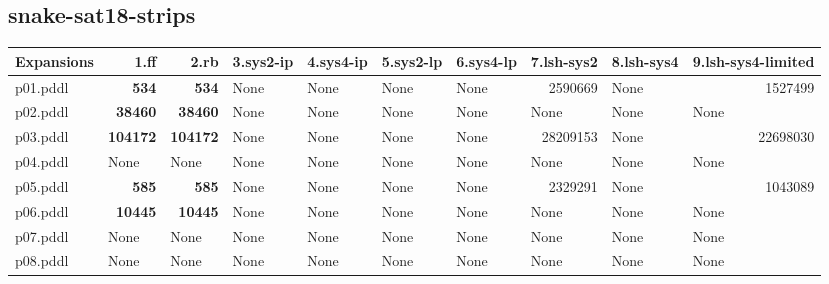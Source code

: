 \documentclass{article}
\begin{document}
\hypertarget{expansions-snake-sat18-strips}{}
\subsection*{snake-sat18-strips}

\begin{tabular}{@{}lrrrrrrrrr@{}}
Expansions & 1.ff & 2.rb & 3.sys2-ip & 4.sys4-ip & 5.sys2-lp & 6.sys4-lp & 7.lsh-sys2 & 8.lsh-sys4 & 9.lsh-sys4-limited \\
\midrule
p01.pddl & \textbf{534} & \textbf{534} & \multicolumn{1}{|l|}{None} & \multicolumn{1}{|l|}{None} & \multicolumn{1}{|l|}{None} & \multicolumn{1}{|l|}{None} & 2590669 & \multicolumn{1}{|l|}{None} & 1527499 \\
p02.pddl & \textbf{38460} & \textbf{38460} & \multicolumn{1}{|l|}{None} & \multicolumn{1}{|l|}{None} & \multicolumn{1}{|l|}{None} & \multicolumn{1}{|l|}{None} & \multicolumn{1}{|l|}{None} & \multicolumn{1}{|l|}{None} & \multicolumn{1}{|l|}{None} \\
p03.pddl & \textbf{104172} & \textbf{104172} & \multicolumn{1}{|l|}{None} & \multicolumn{1}{|l|}{None} & \multicolumn{1}{|l|}{None} & \multicolumn{1}{|l|}{None} & 28209153 & \multicolumn{1}{|l|}{None} & 22698030 \\
p04.pddl & \multicolumn{1}{|l|}{None} & \multicolumn{1}{|l|}{None} & \multicolumn{1}{|l|}{None} & \multicolumn{1}{|l|}{None} & \multicolumn{1}{|l|}{None} & \multicolumn{1}{|l|}{None} & \multicolumn{1}{|l|}{None} & \multicolumn{1}{|l|}{None} & \multicolumn{1}{|l|}{None} \\
p05.pddl & \textbf{585} & \textbf{585} & \multicolumn{1}{|l|}{None} & \multicolumn{1}{|l|}{None} & \multicolumn{1}{|l|}{None} & \multicolumn{1}{|l|}{None} & 2329291 & \multicolumn{1}{|l|}{None} & 1043089 \\
p06.pddl & \textbf{10445} & \textbf{10445} & \multicolumn{1}{|l|}{None} & \multicolumn{1}{|l|}{None} & \multicolumn{1}{|l|}{None} & \multicolumn{1}{|l|}{None} & \multicolumn{1}{|l|}{None} & \multicolumn{1}{|l|}{None} & \multicolumn{1}{|l|}{None} \\
p07.pddl & \multicolumn{1}{|l|}{None} & \multicolumn{1}{|l|}{None} & \multicolumn{1}{|l|}{None} & \multicolumn{1}{|l|}{None} & \multicolumn{1}{|l|}{None} & \multicolumn{1}{|l|}{None} & \multicolumn{1}{|l|}{None} & \multicolumn{1}{|l|}{None} & \multicolumn{1}{|l|}{None} \\
p08.pddl & \multicolumn{1}{|l|}{None} & \multicolumn{1}{|l|}{None} & \multicolumn{1}{|l|}{None} & \multicolumn{1}{|l|}{None} & \multicolumn{1}{|l|}{None} & \multicolumn{1}{|l|}{None} & \multicolumn{1}{|l|}{None} & \multicolumn{1}{|l|}{None} & \multicolumn{1}{|l|}{None} \\

\end{tabular}
\end{document}

